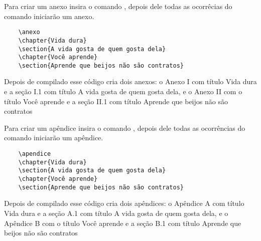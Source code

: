 Para criar um anexo insira o comando , depois dele todas
as ocorrêcias do comando  iniciarão um anexo.
\begin{tcolorbox}[title={Como criar anexos}]
	\begin{lstlisting}
	\anexo
	\chapter{Vida dura}
	\section{A vida gosta de quem gosta dela}
	\chapter{Você aprende}
	\section{Aprende que beijos não são contratos}
	\end{lstlisting}
	\tcblower
	
Depois de compilado esse código cria dois anexos: o Anexo I com
título Vida dura e a seção I.1 com título A vida gosta de quem gosta
dela, e o Anexo II com o título Você aprende e a seção II.1 com título
Aprende que beijos não são contratos
\end{tcolorbox}

Para criar um apêndice insira o comando ,
depois dele todas as ocorrências do comando 
iniciarão um apêndice.
\begin{tcolorbox}[title={Como criar apêndice}]
	\begin{lstlisting}
	\apendice
	\chapter{Vida dura}
	\section{A vida gosta de quem gosta dela}
	\chapter{Você aprende}
	\section{Aprende que beijos não são contratos}
	\end{lstlisting}
	\tcblower
	
Depois de compilado esse código cria dois apêndices: o
Apêndice A com título Vida dura e a seção A.1 com título A
vida gosta de quem gosta dela, e o Apêndice B com o título
Você aprende e a seção B.1 com título Aprende que beijos
não são contratos
\end{tcolorbox}
